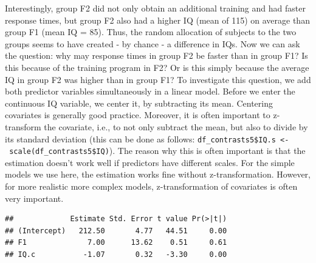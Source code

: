 \documentclass[12pt,]{krantz}
\newenvironment{Shaded}{\begin{snugshade}}{\end{snugshade}}
\newcommand{\DataTypeTok}[1]{\textcolor[rgb]{0.13,0.29,0.53}{#1}}
\newcommand{\DecValTok}[1]{\textcolor[rgb]{0.00,0.00,0.81}{#1}}
\newcommand{\KeywordTok}[1]{\textcolor[rgb]{0.13,0.29,0.53}{\textbf{#1}}}
\newcommand{\NormalTok}[1]{#1}
\newcommand{\OperatorTok}[1]{\textcolor[rgb]{0.81,0.36,0.00}{\textbf{#1}}}
\newcommand{\StringTok}[1]{\textcolor[rgb]{0.31,0.60,0.02}{#1}}
\begin{document}
Interestingly, group F2 did not only obtain an additional training and had faster response times, but group F2 also had a higher IQ (mean of 115) on average than group F1 (mean IQ = 85). Thus, the random allocation of subjects to the two groups seems to have created - by chance - a difference in IQs. Now we can ask the question: why may response times in group F2 be faster than in group F1? Is this because of the training program in F2? Or is this simply because the average IQ in group F2 was higher than in group F1? To investigate this question, we add both predictor variables simultaneously in a linear model. Before we enter the continuous IQ variable, we center it, by subtracting its mean. Centering covariates is generally good practice. Moreover, it is often important to z-transform the covariate, i.e., to not only subtract the mean, but also to divide by its standard deviation (this can be done as follows: \texttt{df\_contrasts5\$IQ.s\ \textless{}-\ scale(df\_contrasts5\$IQ)}). The reason why this is often important is that the estimation doesn't work well if predictors have different scales. For the simple models we use here, the estimation works fine without z-transformation. However, for more realistic more complex models, z-transformation of covariates is often very important.

\begin{Shaded}
\end{Shaded}

\begin{Shaded}
\end{Shaded}

\begin{verbatim}
##             Estimate Std. Error t value Pr(>|t|)
## (Intercept)   212.50       4.77   44.51     0.00
## F1              7.00      13.62    0.51     0.61
## IQ.c           -1.07       0.32   -3.30     0.00
\end{verbatim}
\end{document}
